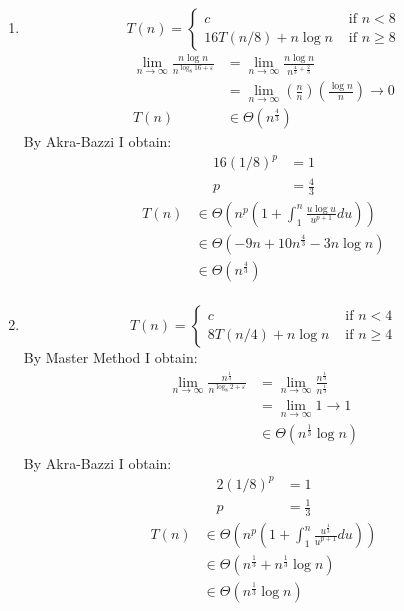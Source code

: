\documentclass[paper=a4,fontsize=11pt]{article}
\begin{document}
\begin{enumerate}
\item
\[
T(n) = \left\{
\begin{array}{cl}
c & \textrm{ if } n < 8\\
16T(n/8) + n\log{n} & \textrm{ if } n \geq 8
\end{array}
\right.
\]
\begin{align*}
\lim_{n\to\infty}{\frac{n\log{n}}{n^{\log_{8}{16}+\varepsilon}}}&=\lim_{n\to\infty}{\frac{n\log{n}}{n^{\frac{4}{3}+\frac{2}{3}}}}\\
&=\lim_{n\to\infty}{(\frac{n}{n})(\frac{\log{n}}{n})}\rightarrow0\\
T(n)&\in\Theta(n^{\frac{4}{3}})
\end{align*}
By Akra-Bazzi I obtain:\\
\begin{align*}
16(1/8)^{p}&=1\\
p&=\frac{4}{3}
\end{align*}
\begin{align*}
T(n) &\in \Theta(n^{p}(1+\int_{1}^{n}{\frac{u\log{u}}{u^{p+1}}du}))\\
&\in \Theta(-9n+10n^{\frac{4}{3}}-3n\log{n})\\
&\in \Theta(n^{\frac{4}{3}})\\
\end{align*}
\item
\[
T(n) = \left\{
\begin{array}{cl}
c & \textrm{ if } n < 4\\
8T(n/4) + n\log n & \textrm{ if } n \geq 4
\end{array}
\right.
\]
By Master Method I obtain:
\begin{align*}
    \lim_{n\to\infty}{\frac{n^{\frac{1}{3}}}{n^{\log_{8}{2}+\varepsilon}}}&=\lim_{n\to\infty}{\frac{n^{\frac{1}{3}}}{n^{\frac{1}{3}}}}\\
    &=\lim_{n\to\infty}{1}\rightarrow1\\
    &\in \Theta(n^{\frac{1}{3}}\log{n})\\
\end{align*}
By Akra-Bazzi I obtain:
\begin{align*}
    2(1/8)^{p}&=1\\
    p&=\frac{1}{3}
\end{align*}
\begin{align*}
    T(n) &\in \Theta(n^{p}(1+\int_{1}^{n}{\frac{u^{\frac{1}{3}}}{u^{p+1}}du}))\\
    &\in \Theta(n^{\frac{1}{3}}+n^{\frac{1}{3}}\log{n})\\
    &\in \Theta(n^{\frac{1}{3}}\log{n})\\
    \end{align*}
\end{enumerate}
\end{document}
